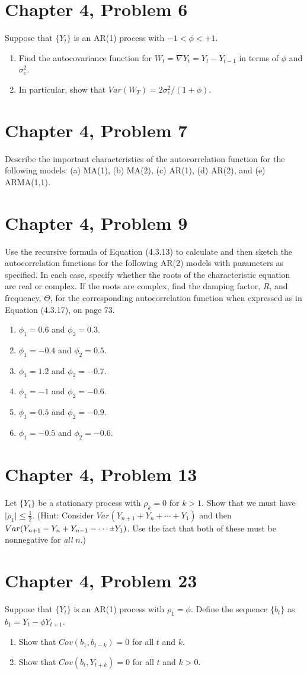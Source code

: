 \documentclass[11pt]{article}
\newif\ifclearpage
\newcommand{\rpm}{\sbox0{$1$}\sbox2{$\scriptstyle\pm$}
  \raise\dimexpr(\ht0-\ht2)/2\relax\box2 }
\newcommand{\problem}[1]{\section*{#1}}
\newcommand{\solution}{\hrulefill}
\newcommand{\maybeclearpage}{\ifclearpage\clearpage\fi}
\begin{document}
\problem{Chapter 4, Problem 6}
Suppose that $\{Y_t\}$ is an AR(1) process with $-1 < \phi < +1$.
\begin{enumerate}
	\item Find the autocovariance function for $W_t = \nabla Y_t = Y_t - Y_{t-1}$ in terms of $\phi$ and $\sigma_e^2$.
	\item In particular, show that $Var(W_T) = 2\sigma_e^2/(1+\phi)$.
\end{enumerate}

\solution


\maybeclearpage
\problem{Chapter 4, Problem 7}
Describe the important characteristics of the autocorrelation function for the following models: (a) MA(1), (b) MA(2), (c) AR(1), (d) AR(2), and (e) ARMA(1,1).

\solution



\maybeclearpage
\problem{Chapter 4, Problem 9}
Use the recursive formula of Equation (4.3.13) to calculate and then sketch the autocorrelation functions for the following AR(2) models with parameters as specified. In each case, specify whether the roots of the characteristic equation are real or complex. If the roots are complex, find the damping factor, $R$, and frequency, $\Theta$, for the corresponding autocorrelation function when expressed as in Equation (4.3.17), on page 73.
\begin{enumerate}
	\item $\phi_1 = 0.6$ and $\phi_2 = 0.3$.
	\item $\phi_1 = -0.4$ and $\phi_2 = 0.5$.
	\item $\phi_1 = 1.2$ and $\phi_2 = -0.7$.
	\item $\phi_1 = -1$ and $\phi_2 = -0.6$.
	\item $\phi_1 = 0.5$ and $\phi_2 = -0.9$.
	\item $\phi_1 = -0.5$ and $\phi_2 = -0.6$.
\end{enumerate}
\solution


\maybeclearpage
\problem{Chapter 4, Problem 13}
Let $\{Y_t\}$ be a stationary process with $\rho_k = 0$ for $k > 1$. Show that we must have $\mid \rho_1 \mid \leq \frac{1}{2}$. (Hint: Consider $Var(Y_{n+1} + Y_n + \cdots + Y_1)$ and then $Var(Y_{n+1} - Y_n + Y_{n-1} - \cdots \rpm Y_1)$. Use the fact that both of these must be nonnegative for \textit{all} $n$.)

\solution


\maybeclearpage
\problem{Chapter 4, Problem 23}
Suppose that $\{Y_t\}$ is an AR(1) process with $\rho_1 = \phi$. Define the sequence $\{b_t\}$ as $b_1 = Y_t - \phi Y_{t+1}$.
\begin{enumerate}
\item Show that $Cov(b_1,b_{t-k}) = 0$ for all $t$ and $k$.
\item Show that $Cov(b_t,Y_{t+k}) = 0$ for all $t$ and $k>0$.
\end{enumerate}

\solution

\maybeclearpage
\end{document}
